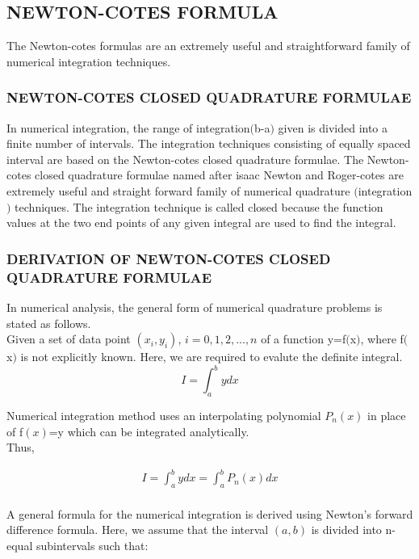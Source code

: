 \documentclass[a4paper,12pt]{report}
\numberwithin{equation}{section}
\begin{document}
\subsection{NEWTON-COTES FORMULA}
The Newton-cotes formulas are an extremely useful and straightforward family of numerical integration techniques.

\subsubsection{NEWTON-COTES CLOSED QUADRATURE FORMULAE}
In numerical integration, the range of integration$($b-a$)$ given is divided into a finite number of intervals. The integration techniques consisting of equally spaced interval are based on the Newton-cotes closed quadrature formulae. The Newton-cotes closed quadrature formulae named after isaac Newton and Roger-cotes are extremely useful and straight forward family of numerical quadrature $($integration$)$ techniques. The integration technique is called closed because the function values at the two end points of any given integral are used to find the integral.





\subsubsection{DERIVATION OF NEWTON-COTES CLOSED QUADRATURE FORMULAE}
In numerical analysis, the general form of numerical quadrature problems is stated as follows.\\
Given a set of data point $(x_i,y_i)$, $i=0,1,2,...,n$ of a function y=f$($x$)$, where f$($x$)$ is not explicitly known. Here, we are required to evalute the definite integral.\\


\begin{equation}
I=\int_{a}^{b}ydx
\end{equation}


 Numerical integration method uses an interpolating polynomial $P_n(x)$ in place of f$(x)$=y which can be integrated analytically.\\
Thus,

\begin{align}
I=\int_{a}^{b}ydx = \int_{a}^{b}P_n(x)dx
\end{align}\\
 

A general formula for the numerical integration is derived using Newton's forward difference formula. 
Here, we assume that the interval $(a,b)$ is divided into n-equal subintervals such that:\\
\end{document}
